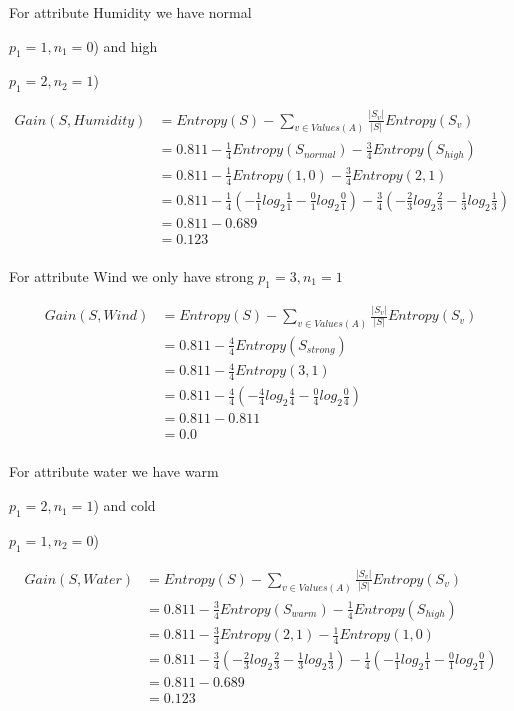 \documentclass[10pt,a4paper]{article}
\begin{document}
{{{{For attribute Humidity we have normal {$p_1=1,n_1=0$) and high {$p_1=2,n_2=1$)

\begin{equation}
\begin{split}
\label{humidity}
Gain(S,Humidity) &= Entropy(S) - \sum_{v \in Values(A)} \frac{\vert S_v\vert}{\vert S\vert}Entropy(S_v) \\
          &= 0.811 - \frac{1}{4} Entropy(S_{normal} ) - \frac{3}{4}Entropy(S_{high}) \\
          &= 0.811 - \frac{1}{4} Entropy(1,0) - \frac{3}{4}Entropy(2,1) \\
          &= 0.811 -\frac{1}{4} ( -\frac{1}{1} log_2\frac{1}{1} -\frac{0}{1} log_2\frac{0}{1} ) - \frac{3}{4}(-\frac{2}{3} log_2\frac{2}{3} - \frac{1}{3}log_2\frac{1}{3} ) \\
          &= 0.811 - 0.689\\
          &= 0.123 \\
\end{split}
\end{equation}

For attribute Wind we only have strong {$p_1=3,n_1=1$}

\begin{equation}
\begin{split}
\label{wind}
Gain(S,Wind) &= Entropy(S) - \sum_{v \in Values(A)} \frac{\vert S_v\vert}{\vert S\vert}Entropy(S_v) \\
          &= 0.811 - \frac{4}{4} Entropy(S_{strong} ) \\
          &= 0.811 - \frac{4}{4} Entropy(3,1) \\
          &= 0.811 -\frac{4}{4} ( -\frac{4}{4} log_2\frac{4}{4} -\frac{0}{4} log_2\frac{0}{4} ) \\
          &= 0.811 - 0.811\\
          &= 0.0 \\
\end{split}
\end{equation}

For attribute water we have warm {$p_1=2,n_1=1$) and cold {$p_1=1,n_2=0$)

\begin{equation}
\begin{split}
\label{water}
Gain(S,Water) &= Entropy(S) - \sum_{v \in Values(A)} \frac{\vert S_v\vert}{\vert S\vert}Entropy(S_v) \\
          &= 0.811 - \frac{3}{4} Entropy(S_{warm} ) - \frac{1}{4}Entropy(S_{high}) \\
          &= 0.811 - \frac{3}{4} Entropy(2,1) - \frac{1}{4}Entropy(1,0) \\
          &= 0.811 -\frac{3}{4} ( -\frac{2}{3} log_2\frac{2}{3} -\frac{1}{3} log_2\frac{1}{3} ) - \frac{1}{4}(-\frac{1}{1} log_2\frac{1}{1} - \frac{0}{1}log_2\frac{0}{1} ) \\
          &= 0.811 - 0.689\\
          &= 0.123 \\
\end{split}
\end{equation}

}}}}}}}}
\end{document}
